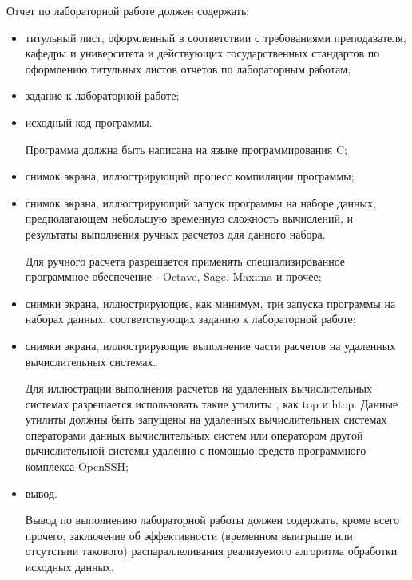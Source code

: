 
Отчет по лабораторной работе должен содержать:

\begin{itemize}

	\item титульный лист, оформленный в соответствии с требованиями преподавателя, кафедры и университета и действующих государственных стандартов по оформлению титульных листов отчетов по лабораторным работам;
	
	\item задание к лабораторной работе;

	\item исходный код программы.

	Программа должна быть написана на языке программирования C;

	\item снимок экрана, иллюстрирующий процесс компиляции программы;

	\item снимок экрана, иллюстрирующий запуск программы на наборе данных, предполагающем небольшую временную сложность вычислений, и результаты выполнения ручных расчетов для данного набора.

	Для ручного расчета разрешается применять специализированное программное обеспечение - Octave, Sage, Maxima и прочее;

	\item снимки экрана, иллюстрирующие, как минимум, три запуска программы на наборах данных, соответствующих заданию к лабораторной работе;

	\item снимки экрана, иллюстрирующие выполнение части расчетов на удаленных вычислительных системах.

	Для иллюстрации выполнения расчетов на удаленных вычислительных системах разрешается использовать такие утилиты \gl, как top и htop. Данные утилиты должны быть запущены на удаленных вычислительных системах операторами данных вычислительных систем или оператором другой вычислительной системы удаленно с помощью средств программного комплекса OpenSSH;

	\item вывод.

	Вывод по выполнению лабораторной работы должен содержать, кроме всего прочего, заключение об эффективности (временном выигрыше или отсутствии такового) распараллеливания реализуемого алгоритма обработки исходных данных.

\end{itemize}

